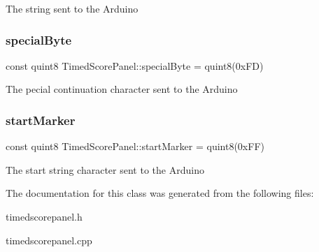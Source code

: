 The string sent to the Arduino \mbox{\label{classTimedScorePanel_a59e028723640161364bf730557737b54}} 
\subsubsection{\texorpdfstring{special\+Byte}{specialByte}}
{\footnotesize\ttfamily const quint8 Timed\+Score\+Panel\+::special\+Byte = quint8(0x\+F\+D)\hspace{0.3cm}{\ttfamily [protected]}}

The pecial continuation character sent to the Arduino \mbox{\label{classTimedScorePanel_ad6785d83eabd109d61604d1893703b25}} 
\subsubsection{\texorpdfstring{start\+Marker}{startMarker}}
{\footnotesize\ttfamily const quint8 Timed\+Score\+Panel\+::start\+Marker = quint8(0x\+F\+F)\hspace{0.3cm}{\ttfamily [protected]}}

The start string character sent to the Arduino 

The documentation for this class was generated from the following files\+:\begin{DoxyCompactItemize}
\item 
timedscorepanel.\+h\item 
timedscorepanel.\+cpp\end{DoxyCompactItemize}
